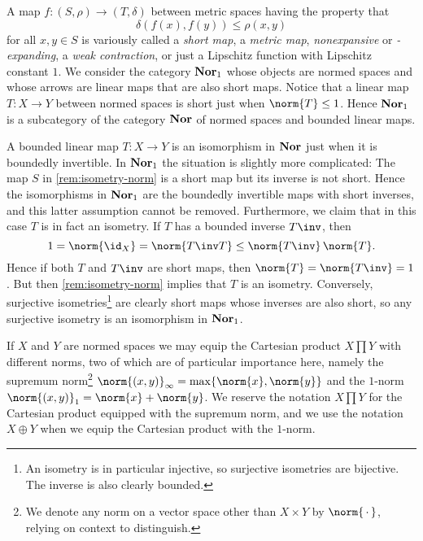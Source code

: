 \documentclass[article, a4paper, 11pt, oneside]{memoir}
\numberwithin{equation}{chapter}
\theoremstyle{nonumberplain}
\begin{document}
\begin{remarkbreak}
	\label{rem:normed-space-categories}
	A map $f \colon (S,\rho) \to (T,\delta)$ between metric spaces having the property that
	\begin{equation*}
		\delta(f(x), f(y))
			\leq \rho(x, y)
	\end{equation*}
	for all $x,y \in S$ is variously called a \emph{short map}, a \emph{metric map}, \emph{nonexpansive} or \emph{-expanding}, a \emph{weak contraction}, or just a Lipschitz function with Lipschitz constant $1$. We consider the category $\mathbf{Nor}_1$ whose objects are normed spaces and whose arrows are linear maps that are also short maps. Notice that a linear map $T \colon X \to Y$ between normed spaces is short just when $\norm{T} \leq 1$. Hence $\mathbf{Nor}_1$ is a subcategory of the category $\mathbf{Nor}$ of normed spaces and bounded linear maps.
	
	A bounded linear map $T \colon X \to Y$ is an isomorphism in $\mathbf{Nor}$ just when it is boundedly invertible. In $\mathbf{Nor}_1$ the situation is slightly more complicated: The map $S$ in \cref{rem:isometry-norm} is a short map but its inverse is not short. Hence the isomorphisms in $\mathbf{Nor}_1$ are the boundedly invertible maps with short inverses, and this latter assumption cannot be removed. Furthermore, we claim that in this case $T$ is in fact an isometry. If $T$ has a bounded inverse $T\inv$, then
	\begin{equation*}
		1 = \norm{\id_X}
			= \norm{T\inv T}
			\leq \norm{T\inv} \, \norm{T}.
	\end{equation*}
	Hence if both $T$ and $T\inv$ are short maps, then $\norm{T} = \norm{T\inv} = 1$. But then \cref{rem:isometry-norm} implies that $T$ is an isometry. Conversely, surjective isometries\footnote{An isometry is in particular injective, so surjective isometries are bijective. The inverse is also clearly bounded.} are clearly short maps whose inverses are also short, so any surjective isometry is an isomorphism in $\mathbf{Nor}_1$.

	If $X$ and $Y$ are normed spaces we may equip the Cartesian product $X \prod Y$ with different norms, two of which are of particular importance here, namely the supremum norm\footnote{We denote any norm on a vector space other than $X \times Y$ by $\norm{\,\cdot\,}$, relying on context to distinguish.} $\norm{(x,y)}_\infty = \max\{ \norm{x}, \norm{y} \}$ and the $1$-norm $\norm{(x,y)}_1 = \norm{x} + \norm{y}$. We reserve the notation $X \prod Y$ for the Cartesian product equipped with the supremum norm, and we use the notation $X \oplus Y$ when we equip the Cartesian product with the $1$-norm.


\end{remarkbreak}
\end{document}
